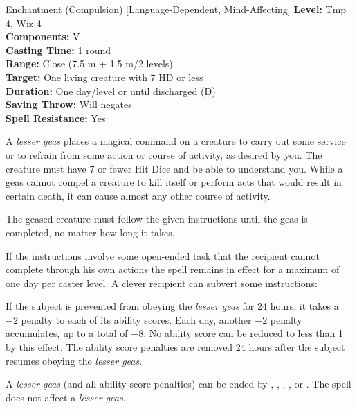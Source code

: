 {Enchantment (Compulsion) [Language-Dependent, Mind-Affecting]}
{
	\textbf{Level:}
	Tmp 4, Wiz 4\\
	\textbf{Components:}
	V\\
	\textbf{Casting Time:}
	1 round\\
	\textbf{Range:}
	Close (7.5 m + 1.5 m/2 levels)\\
	\textbf{Target:}
	One living creature with 7 HD or less\\
	\textbf{Duration:}
	One day/level or until discharged (D)\\
	\textbf{Saving Throw:}
	Will negates\\
	\textbf{Spell Resistance:}
	Yes\\
}
{
	A \emph{lesser geas} places a magical command on a creature to carry out some service or to refrain from some action or course of activity, as desired by you. The creature must have 7 or fewer Hit Dice and be able to understand you. While a geas cannot compel a creature to kill itself or perform acts that would result in certain death, it can cause almost any other course of activity.

	The geased creature must follow the given instructions until the geas is completed, no matter how long it takes.

	If the instructions involve some open-ended task that the recipient cannot complete through his own actions the spell remains in effect for a maximum of one day per caster level. A clever recipient can subvert some instructions:

	If the subject is prevented from obeying the \emph{lesser geas} for 24 hours, it takes a $-2$ penalty to each of its ability scores. Each day, another $-2$ penalty accumulates, up to a total of $-8$. No ability score can be reduced to less than 1 by this effect. The ability score penalties are removed 24 hours after the subject resumes obeying the \emph{lesser geas}.

	A \emph{lesser geas} (and all ability score penalties) can be ended by , , , , or . The  spell does not affect a \emph{lesser geas}.

}
